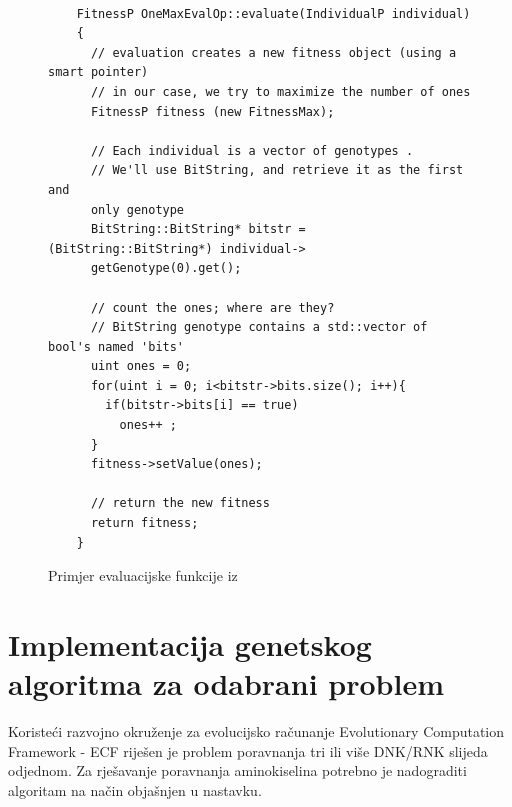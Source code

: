 \documentclass[times, utf8, zavrsni, numeric]{fer}
\begin{document}
 \begin{figure}[!httb]
 	
 	\begin{verbatim}

 	FitnessP OneMaxEvalOp::evaluate(IndividualP individual)
 	{
 	  // evaluation creates a new fitness object (using a smart pointer)
 	  // in our case, we try to maximize the number of ones
 	  FitnessP fitness (new FitnessMax);
 	
 	  // Each individual is a vector of genotypes .
 	  // We'll use BitString, and retrieve it as the first and 
 	  only genotype
 	  BitString::BitString* bitstr = (BitString::BitString*) individual->
 	  getGenotype(0).get(); 
 	
 	  // count the ones; where are they?
 	  // BitString genotype contains a std::vector of bool's named 'bits'
 	  uint ones = 0;
 	  for(uint i = 0; i<bitstr->bits.size(); i++){
 	    if(bitstr->bits[i] == true)
 	      ones++ ;
 	  }
 	  fitness->setValue(ones);
 	
 	  // return the new fitness
 	  return fitness;
 	}
 	\end{verbatim}
 	\caption{Primjer evaluacijske funkcije iz  \cite{ecfManual}}
 	\label{fig:eval}
 \end{figure}
 


\renewcommand{\lstlistingname}{Isječak koda}
\lstset{language=C++, tabsize=2, numbers = left, stepnumber=1, showstringspaces=false, basicstyle=\footnotesize}
\chapter{Implementacija genetskog algoritma za odabrani problem} \label{implementacija}
Koristeći razvojno okruženje za evolucijsko računanje Evolutionary Computation Framework - ECF riješen je problem poravnanja tri ili više DNK/RNK slijeda odjednom. Za rješavanje poravnanja aminokiselina potrebno je nadograditi algoritam na način objašnjen u nastavku.
\end{document}
